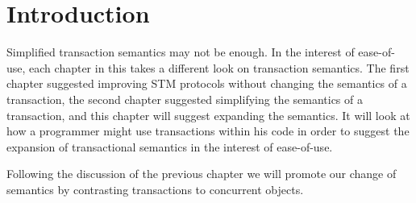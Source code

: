 % 
% 
% 
% 
% 
% 
% 
% 
% 

\section{Introduction}
\label{sec:SIintro}

Simplified transaction semantics may not be enough.
In the interest of ease-of-use, each chapter in this takes a 
different look on transaction semantics.
The first chapter suggested improving STM
protocols without changing the semantics of a transaction, the second
chapter suggested simplifying the semantics of a transaction,
and this chapter will suggest expanding the semantics.
It will look at how a programmer might use transactions
within his code in order to suggest the expansion of transactional
semantics in the interest of ease-of-use.

Following the discussion of the previous chapter we will promote our change
of semantics by contrasting transactions to concurrent objects.

